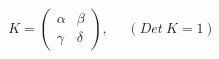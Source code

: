 \begin{equation}
K=\left(
\begin{array}{cc}
\alpha & \beta \\
\gamma & \delta
\end{array} \right),~~~~~~(Det~K=1)
\end{equation}

